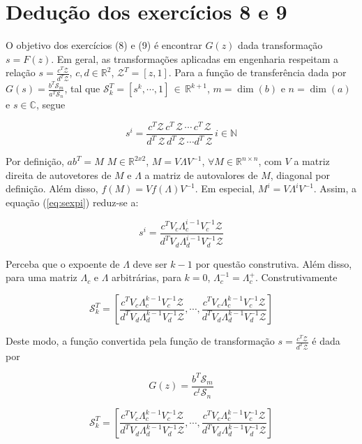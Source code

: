 \section*{Dedução dos exercícios 8 e 9}
\label{sec:deducao89}

    O objetivo dos exercícios (8) e (9) é encontrar $G(z)$ dada transformação $s = F(z)$. Em geral, as transformações aplicadas em engenharia respeitam a relação $s = \frac{c^T \mathcal{Z}}{d^T \mathcal{Z}}$, $c, d \in \mathbb{R}^2$, $\mathcal{Z}^T = [z, 1] $. Para a função de transferência dada por $G(s) = \frac{b^T \mathcal{S}_m}{a^T \mathcal{S}_n}$, tal que $\mathcal{S}_k^T = [s^k, \cdots, 1]  \, \in \, \mathbb{R}^{k+1}$, $m = \dim(b)$ e $n = \dim(a)$ e $s \in \mathbb{C}$, segue
    
    \begin{equation}
        s^i = \frac{c^T \mathcal{Z} \, c^T \, \mathcal{Z} \, \cdots \, c^T \, \mathcal{Z}}{d^T \, \mathcal{Z} \, d^T \, \mathcal{Z} \, \cdots d^T \, \mathcal{Z}} \, i \in \mathbb{N}
        \label{eq:sexpi}
    \end{equation}
    
    Por definição, $a b^T = M \,\, M \in \mathbb{R}^{2x2}$, $M = V \Lambda V^{-1}$, $\forall M \in \mathbb{R}^{n \times n}$, com $V$ a matriz direita de autovetores de $M$ e $\Lambda$ a matriz de autovalores de $M$, diagonal por definição. Além disso, $f(M) = V f(\Lambda) V^{-1}$. Em especial, $M^i = V \Lambda^i V^{-1}$. Assim, a equação (\ref{eq:sexpi}) reduz-se a:
    
    \begin{equation}
        s^i = \frac{c^T V_c \Lambda_c^{i-1} V_c^{-1} \mathcal{Z}}{d^T V_d \Lambda_d^{i-1} V_d^{-1} \mathcal{Z}}
    \end{equation}
    
    Perceba que o expoente de $\Lambda$ deve ser $k - 1$ por questão construtiva. Além disso, para uma matriz $\Lambda_c$ e $\Lambda$ arbitrárias, para $k = 0$, $\Lambda_c^{-1} = \Lambda_c^{+}$. Construtivamente
    
    \begin{equation}
        \mathcal{S}_k^T = \left[\frac{c^T V_c \Lambda_c^{k-1} V_c^{-1} \mathcal{Z}}{d^T V_d \Lambda_d^{k-1} V_d^{-1} \mathcal{Z}}, \cdots, \frac{c^T V_c \Lambda_c^{k-1} V_c^{-1} \mathcal{Z}}{d^T V_d \Lambda_d^{k-1} V_d^{-1} \mathcal{Z}}\right]
    \end{equation}
    
    Deste modo, a função convertida pela função de transformação $s = \frac{c^T \mathcal{Z}}{d^T \mathcal{Z}}$ é dada por
    
    \begin{equation}
        G(z) = \frac{b^T \mathcal{S}_m}{c^t \mathcal{S}_n}    
    \end{equation}
    
    \begin{equation}
        \mathcal{S}_k^T = \left[\frac{c^T V_c \Lambda_c^{k-1} V_c^{-1} \mathcal{Z}}{d^T V_d \Lambda_d^{k-1} V_d^{-1} \mathcal{Z}}, \cdots, \frac{c^T V_c \Lambda_c^{k-1} V_c^{-1} \mathcal{Z}}{d^T V_d \Lambda_d^{k-1} V_d^{-1} \mathcal{Z}}\right]
    \end{equation}